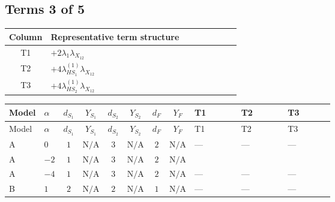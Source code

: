 \documentclass[8pt]{article}
\begin{document}
\begin{landscape}
\subsection*{Terms 3 of 5}
\begin{center}
\begin{tabular}{@{}c >{\raggedright\arraybackslash}p{0.82\linewidth}@{}}
\toprule
Column & Representative term structure \\
\midrule
T1 & \(\displaystyle +2 {\lambda_1} {\lambda_{X_{12}}}\) \\
\midrule
T2 & \(\displaystyle +4 {\lambda_{HS_1}^{(1)}} {\lambda_{X_{12}}}\) \\
\midrule
T3 & \(\displaystyle +4 {\lambda_{HS_2}^{(1)}} {\lambda_{X_{12}}}\) \\
\midrule
\bottomrule
\end{tabular}
\end{center}
\smallskip
\tiny
\begin{longtable}{@{}llcccccc >{\raggedright\arraybackslash}p{0.21\linewidth} >{\raggedright\arraybackslash}p{0.21\linewidth} >{\raggedright\arraybackslash}p{0.21\linewidth}@{}}
\toprule
Model & $\alpha$ & $d_{S_1}$ & $Y_{S_1}$ & $d_{S_2}$ & $Y_{S_2}$ & $d_F$ & $Y_F$ & T1 & T2 & T3 \\
\midrule
\endfirsthead
\toprule
Model & $\alpha$ & $d_{S_1}$ & $Y_{S_1}$ & $d_{S_2}$ & $Y_{S_2}$ & $d_F$ & $Y_F$ & T1 & T2 & T3 \\
\midrule
\endhead
A & $0$ & $1$ & $\text{N/A}$ & $3$ & $\text{N/A}$ & $2$ & $\text{N/A}$ & --- & --- & --- \\
\midrule
A & $-2$ & $1$ & $\text{N/A}$ & $3$ & $\text{N/A}$ & $2$ & $\text{N/A}$ & \scriptsize\adjustbox{max width=\linewidth}{$\begin{gathered} +2 {\lambda_1} {\lambda_{X_{12}}}\end{gathered}$} & \scriptsize\adjustbox{max width=\linewidth}{$\begin{gathered} +4 {\lambda_{HS_1}^{(1)}} {\lambda_{X_{12}}}\end{gathered}$} & \scriptsize\adjustbox{max width=\linewidth}{$\begin{gathered} +4 {\lambda_{HS_2}^{(1)}} {\lambda_{X_{12}}}\end{gathered}$} \\
\midrule
A & $-4$ & $1$ & $\text{N/A}$ & $3$ & $\text{N/A}$ & $2$ & $\text{N/A}$ & --- & --- & --- \\
\midrule
B & $1$ & $2$ & $\text{N/A}$ & $2$ & $\text{N/A}$ & $1$ & $\text{N/A}$ & --- & --- & --- \\

\end{longtable}
\end{landscape}
\end{document}
